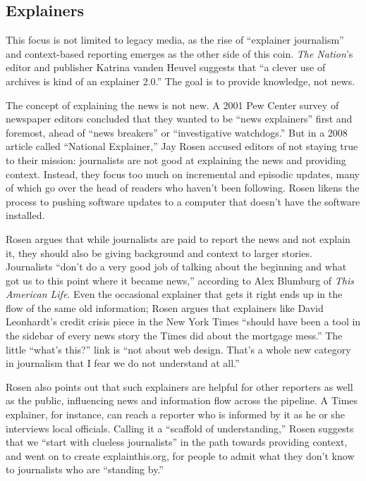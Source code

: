 
\subsection{Explainers}

This focus is not limited to legacy media, as the rise of ``explainer journalism'' and context-based reporting emerges as the other side of this coin. \emph{The Nation}'s editor and publisher Katrina vanden Heuvel suggests that ``a clever use of archives is kind of an explainer 2.0.''\autocite{} The goal is to provide knowledge, not news.

The concept of explaining the news is not new. A 2001 Pew Center survey of newspaper editors concluded that they wanted to be ``news explainers'' first and foremost, ahead of ``news breakers'' or ``investigative watchdogs.'' But in a 2008 article called ``National Explainer,'' Jay Rosen accused editors of not staying true to their mission: journalists are not good at explaining the news and providing context. Instead, they focus too much on incremental and episodic updates, many of which go over the head of readers who haven't been following. Rosen likens the process to pushing software updates to a computer that doesn't have the software installed.

Rosen argues that while journalists are paid to report the news and not explain it, they should also be giving background and context to larger stories. Journalists ``don’t do a very good job of talking about the beginning and what got us to this point where it became news,'' according to Alex Blumburg of \emph{This American Life}. Even the occasional explainer that gets it right ends up in the flow of the same old information; Rosen argues that explainers like David Leonhardt's credit crisis piece in the New York Times ``should have been a tool in the sidebar of every news story the Times did about the mortgage mess.'' The little ``what's this?'' link is ``not about web design. That's a whole new category in journalism that I fear we do not understand at all.''

Rosen also points out that such explainers are helpful for other reporters as well as the public, influencing news and information flow across the pipeline. A Times explainer, for instance, can reach a reporter who is informed by it as he or she interviews local officials. Calling it a ``scaffold of understanding,'' Rosen suggests that we ``start with clueless journalists'' in the path towards providing context, and went on to create explainthis.org, for people to admit what they don't know to journalists who are ``standing by.''\autocite{rosen_2008}

